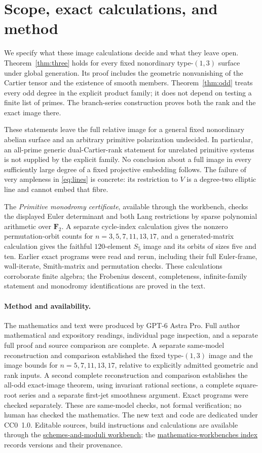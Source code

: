 \documentclass[11pt]{article}
\theoremstyle{remark}\newtheorem{remark}[theorem]{Remark}
\newcommand{\FF}{\mathbf F}
\newcommand{\workbenchurl}{https://github.com/KokunoYumeto/schemes-and-moduli-workbench}
\newcommand{\recordurl}{https://github.com/KokunoYumeto/mathematics-workbenches}
\begin{document}
\section{Scope, exact calculations, and method}\label{sec:scope}

We specify what these image calculations decide and what they leave open. Theorem~\ref{thm:three} holds for every fixed nonordinary type-$(1,3)$ surface under global generation. Its proof includes the geometric nonvanishing of the Cartier tensor and the existence of smooth members. Theorem~\ref{thm:odd} treats every odd degree in the explicit product family; it does not depend on testing a finite list of primes. The branch-series construction proves both the rank and the exact image there.

These statements leave the full relative image for a general fixed nonordinary abelian surface and an arbitrary primitive polarization undecided. In particular, an all-prime generic dual-Cartier-rank statement for unrelated primitive systems is not supplied by the explicit family. No conclusion about a full image in every sufficiently large degree of a fixed projective embedding follows. The failure of very ampleness in \eqref{eq:lines} is concrete: its restriction to $V$ is a degree-two elliptic line and cannot embed that fibre.

The \emph{Primitive monodromy certificate}, available through the workbench, checks the displayed Euler determinant and both Lang restrictions by sparse polynomial arithmetic over $\FF_2$. A separate cycle-index calculation gives the nonzero permutation-orbit counts for $n=3,5,7,11,13,17$, and a generated-matrix calculation gives the faithful $120$-element $S_5$ image and its orbits of sizes five and ten. Earlier exact programs were read and rerun, including their full Euler-frame, wall-iterate, Smith-matrix and permutation checks. These calculations corroborate finite algebra; the Frobenius descent, completeness, infinite-family statement and monodromy identifications are proved in the text.

\paragraph{Method and availability.}
The mathematics and text were produced by GPT-6 Astra Pro. Full author mathematical and expository readings, individual page inspection, and a separate full proof and source comparison are complete. A separate same-model reconstruction and comparison established the fixed type-$(1,3)$ image and the image bounds for $n=5,7,11,13,17$, relative to explicitly admitted geometric and rank inputs. A second complete reconstruction and comparison establishes the all-odd exact-image theorem, using invariant rational sections, a complete square-root series and a separate first-jet smoothness argument. Exact programs were checked separately. These are same-model checks, not formal verification; no human has checked the mathematics. The new text and code are dedicated under CC0~1.0. Editable sources, build instructions and calculations are available through the \href{\workbenchurl}{schemes-and-moduli workbench}; the \href{\recordurl}{mathematics-workbenches index} records versions and their provenance.
\end{document}
